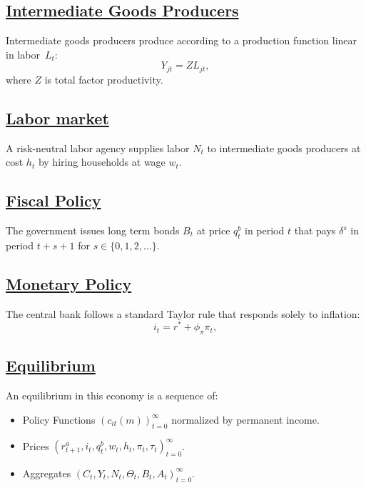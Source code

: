 \documentclass[\latexroot/\projectname]{subfiles}
\begin{document}
\subsection{\href{https://econ-ark.github.io/HAFiscal/\#sec:hank-intermediate-goods-producers}{Intermediate Goods Producers}}\whenintegrated{\label{sec:hank-intermediate-goods-producers}}

Intermediate goods producers produce according to a production function linear in labor~$L_{t}$:
\[
  Y_{jt} =  Z L_{jt},
\]
where $Z$ is total factor productivity.

\subsection{\href{https://econ-ark.github.io/HAFiscal/\#sec:hank-labor-market}{Labor market}}\whenintegrated{\label{sec:hank-labor-market}}

A risk-neutral labor agency supplies labor \( N_t \) to intermediate goods producers at cost \( h_t \) by hiring households at wage \( w_t \). 


\subsection{\href{https://econ-ark.github.io/HAFiscal/\#sec:hank-fiscal-policy}{Fiscal Policy}}\whenintegrated{\label{sec:hank-fiscal-policy}}

The government issues long term bonds $B_{t}$ at price $q^{b}_{t}$ in period $t$ that pays $\delta^{s}$ in period $t+s+1$ for $s \in \{0,1,2,\ldots\}$.

\subsection{\href{https://econ-ark.github.io/HAFiscal/\#sec:hank-monetary-policy}{Monetary Policy}}\whenintegrated{\label{sec:hank-monetary-policy}}

The central bank follows a standard Taylor rule that responds solely to inflation:
\[
  i_{t} = r^{*} +\phi_{\pi} \pi_{t},
\]

\subsection{\href{https://econ-ark.github.io/HAFiscal/\#sec:hank-equilibrium}{Equilibrium}}\whenintegrated{\label{sec:hank-equilibrium}}

An equilibrium in this economy is a sequence of:
\begin{itemize}[label=--]
  \item
        Policy Functions ${\left( c_{it}(m) \right )}_{t=0}^{\infty}$ normalized by permanent income.
  \item
        Prices $ {\left( r^{a}_{t+1}, i_{t}, q^{b}_{t},  w_{t}, h_{t} , \pi_{t} , \tau_{t} \right) }_{t=0}^{\infty}$.
  \item
        Aggregates $ {\left(C_{t}, Y_{t} , N_{t},   \Theta_{t},  B_{t} , A_{t}  \right)}_{t=0}^{\infty}$.
\end{itemize}
\end{document}
